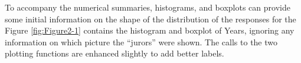 \documentclass[]{book}
\newenvironment{Shaded}{\begin{snugshade}}{\end{snugshade}}
\newcommand{\KeywordTok}[1]{\textcolor[rgb]{0.13,0.29,0.53}{\textbf{#1}}}
\newcommand{\DataTypeTok}[1]{\textcolor[rgb]{0.13,0.29,0.53}{#1}}
\newcommand{\StringTok}[1]{\textcolor[rgb]{0.31,0.60,0.02}{#1}}
\newcommand{\OperatorTok}[1]{\textcolor[rgb]{0.81,0.36,0.00}{\textbf{#1}}}
\newcommand{\NormalTok}[1]{#1}
\begin{document}
To accompany the numerical summaries, histograms, and boxplots can
provide some initial information on the shape of the distribution of the
responses for the Figure \ref{fig:Figure2-1} contains the histogram and
boxplot of Years, ignoring any information on which picture the
``jurors'' were shown. The calls to the two plotting functions are
enhanced slightly to add better labels.



\begin{Shaded}
\end{Shaded}
\end{document}
